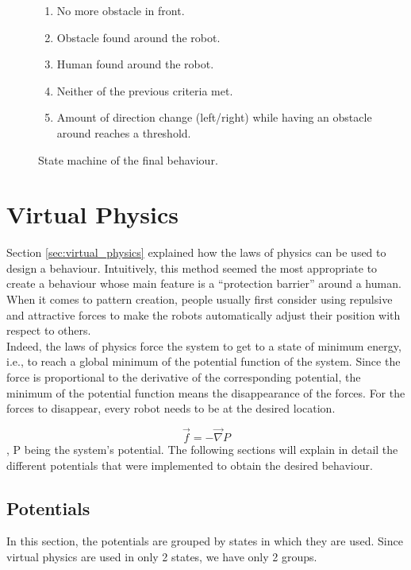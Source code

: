\documentclass[a4paper, 12pt]{report}
\begin{document}
\begin{figure}[!h]
\begin{minipage}[c]{.49\textwidth}
			\begin{enumerate}
				\item No more obstacle in front.
				\item Obstacle found around the robot.
				\item Human found around the robot.
				\item Neither of the previous criteria met.
				\item Amount of direction change (left/right) while having an obstacle around reaches a threshold.
			\end{enumerate}
		\end{minipage}
		
		\caption{State machine of the final behaviour.}
		\label{fig:state_machine}
	\end{figure}
	
	\section{Virtual Physics}
	
	Section \ref{sec:virtual_physics} explained how the laws of physics can be used to design a behaviour. Intuitively, this method seemed the most appropriate to create a behaviour whose main feature is a \enquote{protection barrier} around a human. When it comes to pattern creation, people usually first consider using repulsive and attractive forces to make the robots automatically adjust their position with respect to others.\\
	
	Indeed, the laws of physics force the system to get to a state of minimum energy, i.e., to reach a global minimum of the potential function of the system. Since the force is proportional to the derivative of the corresponding potential, the minimum of the potential function means the disappearance of the forces. For the forces to disappear, every robot needs to be at the desired location.
	
	$$\vec{f} = -\vec{\nabla}P$$, P being the system's potential. The following sections will explain in detail the different potentials that were implemented to obtain the desired behaviour.
	
		\subsection{Potentials}
		
		In this section, the potentials are grouped by states in which they are used. Since virtual physics are used in only 2 states, we have only 2 groups.
		
\end{document}

